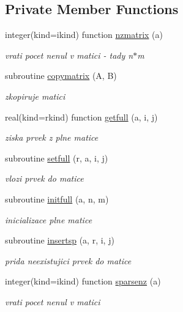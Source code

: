 \subsection*{\-Private \-Member \-Functions}
\begin{DoxyCompactItemize}
\item 
integer(kind=ikind) function \hyperlink{classmtx_aac2e9af9cc01d6d2e4c305eb6ba95b7c}{nzmatrix} (a)
\begin{DoxyCompactList}\small\item\em vrati pocet nenul v matici -\/ tady n$\ast$m \end{DoxyCompactList}\item 
subroutine \hyperlink{classmtx_add2b7c4a3a806aebca088907544db1e0}{copymatrix} (\-A, \-B)
\begin{DoxyCompactList}\small\item\em zkopiruje matici \end{DoxyCompactList}\item 
real(kind=rkind) function \hyperlink{classmtx_a19fea5b5c69870346797740e80888c31}{getfull} (a, i, j)
\begin{DoxyCompactList}\small\item\em ziska prvek z plne matice \end{DoxyCompactList}\item 
subroutine \hyperlink{classmtx_ad535bdf867ccb7c8e9b27f17609e6517}{setfull} (r, a, i, j)
\begin{DoxyCompactList}\small\item\em vlozi prvek do matice \end{DoxyCompactList}\item 
subroutine \hyperlink{classmtx_a9d997a2261d0627633b50e21779cafeb}{initfull} (a, n, m)
\begin{DoxyCompactList}\small\item\em inicializace plne matice \end{DoxyCompactList}\item 
subroutine \hyperlink{classmtx_acfaae9fe81311d1d0a7c0b57b8db4204}{insertsp} (a, r, i, j)
\begin{DoxyCompactList}\small\item\em prida neexistujici prvek do matice \end{DoxyCompactList}\item 
integer(kind=ikind) function \hyperlink{classmtx_a26863ad7b18a9d30bfc146bc494bcb48}{sparsenz} (a)
\begin{DoxyCompactList}\small\item\em vrati pocet nenul v matici \end{DoxyCompactList}\end{DoxyCompactItemize}


